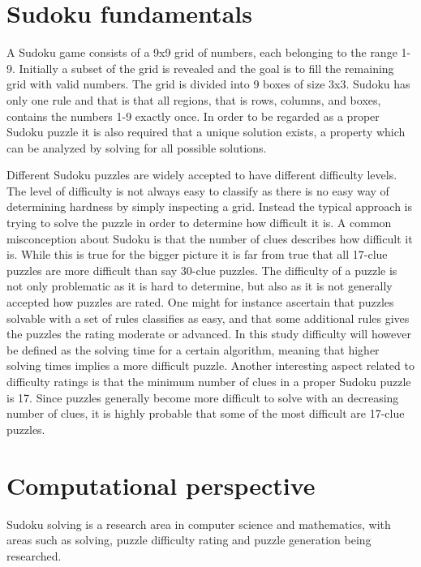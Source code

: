 \documentclass[a4paper,11pt]{kth-mag}
\begin{document}
\FloatBarrier
\section{Sudoku fundamentals}
A Sudoku game consists of a 9x9 grid of numbers, each belonging to the range 1-9.
Initially a subset of the grid is revealed and the goal is to fill the remaining grid with valid numbers.
The grid is divided into 9 boxes of size 3x3.
Sudoku has only one rule and that is that all regions, that is rows, columns, and boxes, contains the numbers 1-9 exactly once.\cite{17clueProof}
In order to be regarded as a proper Sudoku puzzle it is also required that a unique solution exists, a property which can be analyzed by solving for all possible solutions.

Different Sudoku puzzles are widely accepted to have different difficulty levels.
The level of difficulty is not always easy to classify as there is no easy way of determining hardness by simply inspecting a grid.
Instead the typical approach is trying to solve the puzzle in order to determine how difficult it is.
A common misconception about Sudoku is that the number of clues describes how difficult it is.
While this is true for the bigger picture it is far from true that all 17-clue puzzles are more difficult than say 30-clue puzzles.\cite{sudokuDifficulty}
The difficulty of a puzzle is not only problematic as it is hard to determine, but also as it is not generally accepted how puzzles are rated.
One might for instance ascertain that puzzles solvable with a set of rules classifies as easy, and that some additional rules gives the puzzles the rating moderate or advanced.
In this study difficulty will however be defined as the solving time for a certain algorithm, meaning that higher solving times implies a more difficult puzzle.
Another interesting aspect related to difficulty ratings is that the minimum number of clues in a proper Sudoku puzzle is 17.\cite{17clueProof} 
Since puzzles generally become more difficult to solve with an decreasing number of clues, it is highly probable that some of the most difficult are 17-clue puzzles. 

\FloatBarrier
\section{Computational perspective}
Sudoku solving is a research area in computer science and mathematics, with areas such as solving, puzzle difficulty rating and puzzle generation being researched.\cite{stochastic, sudokuConstruct, generation}
\end{document}
